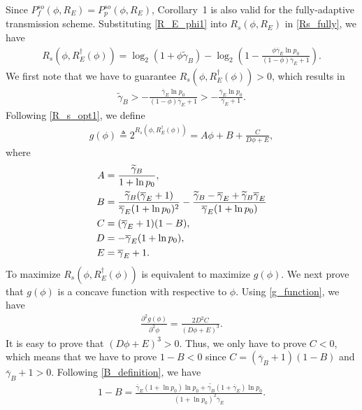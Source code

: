 \documentclass[journal]{IEEEtran}
\begin{document}
\begin{IEEEproof}
Since $P^{so}_f(\phi, R_E) = P^{so}_p(\phi, R_E)$, Corollary~1 is also valid for the fully-adaptive transmission scheme. Substituting \eqref{R_E_phi1} into $R_s(\phi, R_E)$ in \eqref{Rs_fully}, we have
\begin{align}\label{R_s_opt1}
R_s(\phi, R_E^{\dag}(\phi)) \!=\! \log_2 (1 \!+\! \phi \widetilde{\gamma}_B) \!-\! \log_2\left(1\!-\!\frac{\phi \overline{\gamma}_E \ln p_0}{(1\!-\!\phi)\overline{\gamma}_E \!+\! 1}\right).
\end{align}
We first note that we have to guarantee $R_s(\phi, R_E^{\dag}(\phi)) > 0$, which results in
\begin{align}\label{condition}
\widetilde{\gamma}_B > - \frac{\overline{\gamma}_E \ln p_0}{(1-\phi)\overline{\gamma}_E + 1} > - \frac{\overline{\gamma}_E \ln p_0}{\overline{\gamma}_E + 1}.
\end{align}
Following \eqref{R_s_opt1}, we define
\begin{align}\label{g_function}
g(\phi) \triangleq 2^{R_s(\phi, R_E^{\dag}(\phi))} = A \phi + B + \frac{C}{D \phi + E},
\end{align}
where
\begin{align}
A &= \frac{\widetilde{\gamma}_B}{1 + \ln p_0},\notag \\
B &= \frac{\widetilde{\gamma}_B (\overline{\gamma}_E + 1)}{\overline{\gamma}_E (1 + \ln p_0)^2} - \frac{\widetilde{\gamma}_B - \overline{\gamma}_E + \widetilde{\gamma}_B \overline{\gamma}_E}{\overline{\gamma}_E (1 + \ln p_0)}\label{B_definition} \\
C &= (\overline{\gamma}_E + 1)(1-B),\notag \\
D &= -\overline{\gamma}_E (1+\ln p_0),\notag \\
E &= \overline{\gamma}_E + 1.\notag
\end{align}
To maximize $R_s(\phi, R_E^{\dag}(\phi))$ is equivalent to maximize $g(\phi)$. We next prove that $g(\phi)$ is a concave function with respective to $\phi$. Using \eqref{g_function}, we have
\begin{align}
\frac{\partial^2 g(\phi)} {\partial^2 \phi} = \frac{2 D^2 C}{(D \phi + E)^3}.
\end{align}
It is easy to prove that $(D \phi + E)^3 > 0$. Thus, we only have to prove $C < 0$, which means that we have to prove $1-B < 0$ since $C = (\overline{\gamma}_B + 1)(1-B)$ and $\overline{\gamma}_B + 1 >0$. Following \eqref{B_definition}, we have
\begin{align}\label{1_B}
1 - B = \frac{ \overline{\gamma}_E(1+\ln p_0)\ln p_0 + \widetilde{\gamma_B} (1+\overline{\gamma}_E)\ln p_0}{(1+\ln p_0)^2 \overline{\gamma}_E}.

\end{align}
\end{IEEEproof}
\end{document}
